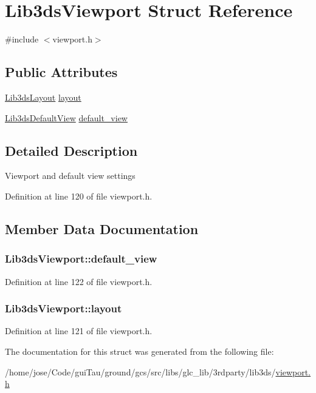 \hypertarget{struct_lib3ds_viewport}{\section{Lib3ds\-Viewport Struct Reference}
\label{struct_lib3ds_viewport}
}


{\ttfamily \#include $<$viewport.\-h$>$}

\subsection*{Public Attributes}
\begin{DoxyCompactItemize}
\item 
\hyperlink{struct_lib3ds_layout}{Lib3ds\-Layout} \hyperlink{struct_lib3ds_viewport_af30b1e0ea6cbf140c0ad875655fc24ac}{layout}
\item 
\hyperlink{struct_lib3ds_default_view}{Lib3ds\-Default\-View} \hyperlink{struct_lib3ds_viewport_acfd66770ec1309249eadc81614cd22d7}{default\-\_\-view}
\end{DoxyCompactItemize}


\subsection{Detailed Description}
Viewport and default view settings 

Definition at line 120 of file viewport.\-h.



\subsection{Member Data Documentation}
\hypertarget{struct_lib3ds_viewport_acfd66770ec1309249eadc81614cd22d7}{
\subsubsection[{default\-\_\-view}]{ Lib3ds\-Viewport\-::default\-\_\-view}}\label{struct_lib3ds_viewport_acfd66770ec1309249eadc81614cd22d7}


Definition at line 122 of file viewport.\-h.

\hypertarget{struct_lib3ds_viewport_af30b1e0ea6cbf140c0ad875655fc24ac}{
\subsubsection[{layout}]{ Lib3ds\-Viewport\-::layout}}\label{struct_lib3ds_viewport_af30b1e0ea6cbf140c0ad875655fc24ac}


Definition at line 121 of file viewport.\-h.



The documentation for this struct was generated from the following file\-:\begin{DoxyCompactItemize}
\item 
/home/jose/\-Code/gui\-Tau/ground/gcs/src/libs/glc\-\_\-lib/3rdparty/lib3ds/\hyperlink{viewport_8h}{viewport.\-h}\end{DoxyCompactItemize}
